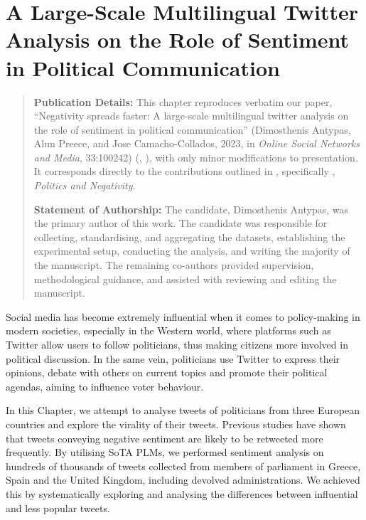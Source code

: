 \setlength{\headheight}{27.2pt}
\chapter{A Large-Scale Multilingual Twitter Analysis on the Role of Sentiment in Political Communication}
\label{ch:political}

\begin{quote}
\textbf{Publication Details:} This chapter reproduces verbatim our paper, ``Negativity spreads faster: A large-scale multilingual twitter analysis on the role of sentiment in political communication'' (Dimosthenis Antypas, Alun Preece, and Jose Camacho-Collados, 2023, in \textit{Online Social Networks and Media}, 33:100242) (, ), with only minor modifications to presentation. It corresponds directly to the contributions outlined in , specifically , \textit{Politics and Negativity}.

\textbf{Statement of Authorship:} The candidate, Dimosthenis Antypas, was the primary author of this work. The candidate was responsible for collecting, standardising, and aggregating the datasets, establishing the experimental setup, conducting the analysis, and writing the majority of the manuscript. The remaining co-authors provided supervision, methodological guidance, and assisted with reviewing and editing the manuscript.
\end{quote}

Social media has become extremely influential when it comes to policy-making in modern societies, especially in the Western world, where platforms such as Twitter allow users to follow politicians, thus making citizens more involved in political discussion. In the same vein, politicians use Twitter to express their opinions, debate with others on current topics and promote their political agendas, aiming to influence voter behaviour. 

In this Chapter, we attempt to analyse tweets of politicians from three European countries and explore the virality of their tweets. Previous studies have shown that tweets conveying negative sentiment are likely to be retweeted more frequently. By utilising \ac{SoTA} \acp{PLM}, we performed sentiment analysis on hundreds of thousands of tweets collected from members of parliament in Greece, Spain and the United Kingdom, including devolved administrations. We achieved this by systematically exploring and analysing the differences between influential and less popular tweets. 

